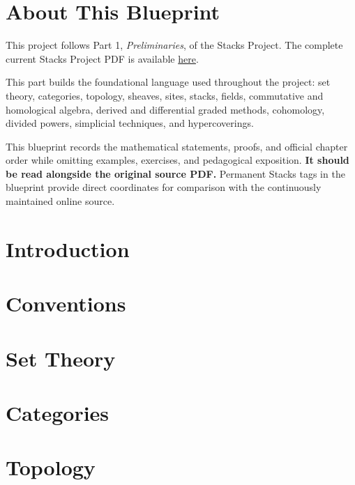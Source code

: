 

\chapter*{About This Blueprint}

This project follows Part 1, \emph{Preliminaries}, of the Stacks Project. The
complete current Stacks Project PDF is available
\href{https://stacks.math.columbia.edu/download/book.pdf}{here}.

This part builds the foundational language used throughout the project: set
theory, categories, topology, sheaves, sites, stacks, fields, commutative and
homological algebra, derived and differential graded methods, cohomology,
divided powers, simplicial techniques, and hypercoverings.

This blueprint records the mathematical statements, proofs, and official
chapter order while omitting examples, exercises, and pedagogical exposition.
\textbf{It should be read alongside the original source PDF.} Permanent Stacks
tags in the blueprint provide direct coordinates for comparison with the
continuously maintained online source.

\chapter{Introduction}
\label{chap:introduction}


\chapter{Conventions}
\label{chap:conventions}


\chapter{Set Theory}
\label{chap:sets}


\chapter{Categories}
\label{chap:categories}


\chapter{Topology}
\label{chap:topology}


